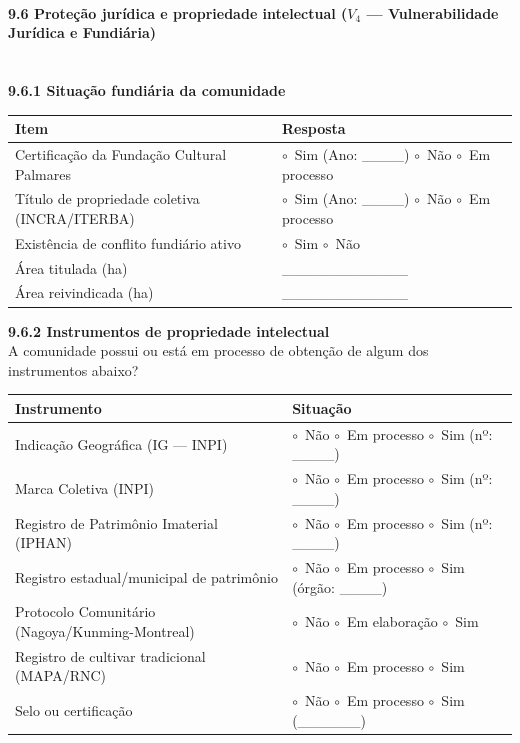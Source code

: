\paragraph{9.6 Proteção jurídica e propriedade intelectual ($V_4$ --- Vulnerabilidade Jurídica e Fundiária)}~\\[4pt]

\textbf{9.6.1 Situação fundiária da comunidade}

{
\begin{longtable}[]{@{}p{6cm}p{6.5cm}@{}}
\toprule\noalign{}
Item & Resposta \\
\midrule\noalign{}
\endhead
\bottomrule\noalign{}
\endlastfoot
Certificação da Fundação Cultural Palmares & $\circ$~Sim (Ano: \_\_\_\_) \quad $\circ$~Não \quad $\circ$~Em processo \\
Título de propriedade coletiva (INCRA/ITERBA) & $\circ$~Sim (Ano: \_\_\_\_) \quad $\circ$~Não \quad $\circ$~Em processo \\
Existência de conflito fundiário ativo & $\circ$~Sim \quad $\circ$~Não \\
Área titulada (ha) & \_\_\_\_\_\_\_\_\_\_\_\_ \\
Área reivindicada (ha) & \_\_\_\_\_\_\_\_\_\_\_\_ \\
\end{longtable}
}

\medskip\noindent\textbf{9.6.2 Instrumentos de propriedade intelectual}\\[2pt]
A comunidade possui ou está em processo de obtenção de algum dos instrumentos abaixo?

{
\begin{longtable}[]{@{}p{5.5cm}p{7cm}@{}}
\toprule\noalign{}
Instrumento & Situação \\
\midrule\noalign{}
\endhead
\bottomrule\noalign{}
\endlastfoot
Indicação Geográfica (IG --- INPI) & $\circ$~Não \quad $\circ$~Em processo \quad $\circ$~Sim (nº: \_\_\_\_) \\
Marca Coletiva (INPI) & $\circ$~Não \quad $\circ$~Em processo \quad $\circ$~Sim (nº: \_\_\_\_) \\
Registro de Patrimônio Imaterial (IPHAN) & $\circ$~Não \quad $\circ$~Em processo \quad $\circ$~Sim (nº: \_\_\_\_) \\
Registro estadual/municipal de patrimônio & $\circ$~Não \quad $\circ$~Em processo \quad $\circ$~Sim (órgão: \_\_\_\_) \\
Protocolo Comunitário (Nagoya/Kunming-Montreal) & $\circ$~Não \quad $\circ$~Em elaboração \quad $\circ$~Sim \\
Registro de cultivar tradicional (MAPA/RNC) & $\circ$~Não \quad $\circ$~Em processo \quad $\circ$~Sim \\
Selo ou certificação & $\circ$~Não \quad $\circ$~Em processo \quad $\circ$~Sim (\_\_\_\_\_\_) \\
\end{longtable}
}

